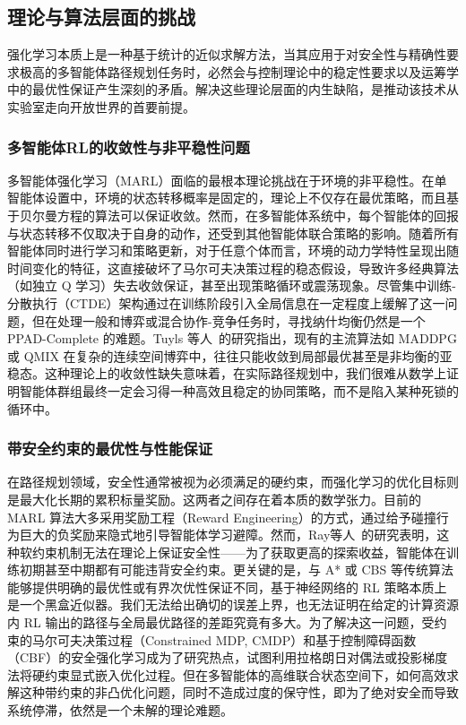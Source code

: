 \documentclass[13.5pt]{extarticle}
\begin{document}
\subsection{理论与算法层面的挑战}

强化学习本质上是一种基于统计的近似求解方法，当其应用于对安全性与精确性要求极高的多智能体路径规划任务时，必然会与控制理论中的稳定性要求以及运筹学中的最优性保证产生深刻的矛盾。解决这些理论层面的内生缺陷，是推动该技术从实验室走向开放世界的首要前提。

\subsubsection{多智能体RL的收敛性与非平稳性问题}

多智能体强化学习（MARL）面临的最根本理论挑战在于环境的非平稳性。在单智能体设置中，环境的状态转移概率是固定的，理论上不仅存在最优策略，而且基于贝尔曼方程的算法可以保证收敛。然而，在多智能体系统中，每个智能体的回报与状态转移不仅取决于自身的动作，还受到其他智能体联合策略的影响。随着所有智能体同时进行学习和策略更新，对于任意个体而言，环境的动力学特性呈现出随时间变化的特征，这直接破坏了马尔可夫决策过程的稳态假设，导致许多经典算法（如独立 Q 学习）失去收敛保证，甚至出现策略循环或震荡现象。尽管集中训练-分散执行（CTDE）架构通过在训练阶段引入全局信息在一定程度上缓解了这一问题，但在处理一般和博弈或混合协作-竞争任务时，寻找纳什均衡仍然是一个 PPAD-Complete 的难题。Tuyls 等人~\cite{tuyls2012multiagent}的研究指出，现有的主流算法如 MADDPG 或 QMIX 在复杂的连续空间博弈中，往往只能收敛到局部最优甚至是非均衡的亚稳态。这种理论上的收敛性缺失意味着，在实际路径规划中，我们很难从数学上证明智能体群组最终一定会习得一种高效且稳定的协同策略，而不是陷入某种死锁的循环中。

\subsubsection{带安全约束的最优性与性能保证}

在路径规划领域，安全性通常被视为必须满足的硬约束，而强化学习的优化目标则是最大化长期的累积标量奖励。这两者之间存在着本质的数学张力。目前的 MARL 算法大多采用奖励工程（Reward Engineering）的方式，通过给予碰撞行为巨大的负奖励来隐式地引导智能体学习避障。然而，Ray等人~\cite{ray2019benchmarking}的研究表明，这种软约束机制无法在理论上保证安全性——为了获取更高的探索收益，智能体在训练初期甚至中期都有可能违背安全约束。更关键的是，与 A* 或 CBS 等传统算法能够提供明确的最优性或有界次优性保证不同，基于神经网络的 RL 策略本质上是一个黑盒近似器。我们无法给出确切的误差上界，也无法证明在给定的计算资源内 RL 输出的路径与全局最优路径的差距究竟有多大。为了解决这一问题，受约束的马尔可夫决策过程（Constrained MDP, CMDP）和基于控制障碍函数（CBF）的安全强化学习成为了研究热点，试图利用拉格朗日对偶法或投影梯度法将硬约束显式嵌入优化过程。但在多智能体的高维联合状态空间下，如何高效求解这种带约束的非凸优化问题，同时不造成过度的保守性，即为了绝对安全而导致系统停滞，依然是一个未解的理论难题。
\end{document}
